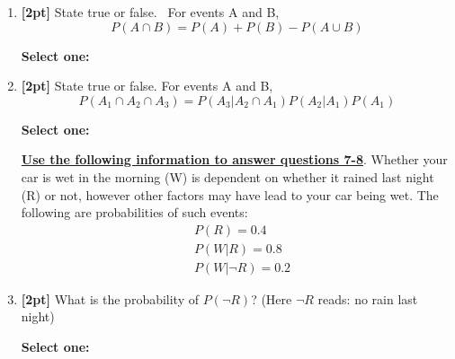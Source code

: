 \documentclass[12pt]{article}
\renewcommand{\circle}{\tikz\draw[black] (0,0) circle (1ex);}
\begin{document}
\begin{enumerate}
    \begin{tcolorbox}[fit,height=1cm, width=2cm, blank, borderline={1pt}{-2pt},nobeforeafter]
    \end{tcolorbox}


    \item \textbf{[2pt]} State true or false.  For events A and B, $$ P(A \cap B) = P(A) + P(B) - P(A \cup B)$$

    \textbf{Select one:}



    \item \textbf{[2pt]} State true or false. For events A and B, $$P(A_1\cap A_2 \cap A_3) = P(A_3|A_2\cap A_1)P(A_2|A_1)P(A_1)$$

    \textbf{Select one:}


    
    
    \bigskip\bigskip\bigskip
    \textbf{\underline{Use the following information to answer questions 7-8}}. Whether your car is wet in the morning (W) is dependent on whether it rained last night (R) or not, however other factors may have lead to your car being wet. The following are probabilities of such events:
    \begin{eqnarray*}
        & P(R) = 0.4\\
        & P(W | R) = 0.8\\
        & P(W | \neg R ) = 0.2
    \end{eqnarray*}
    
\clearpage
    \item \textbf{[2pt]} What is the probability of $P(\neg R)$?
(Here $ \neg R$ reads: no rain last night)

    \textbf{Select one:}




\end{enumerate}
\end{document}
